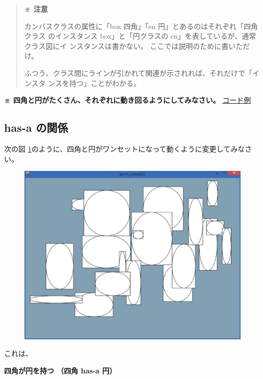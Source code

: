\documentclass[uplatex,a4j,11pt]{jsarticle}
\begin{document}
\begin{quotation}
 {\bfseries ※ 注意}

 カンバスクラスの属性に「box 四角」「en 円」とあるのはそれぞれ「四角クラス
 のインスタンス box」と「円クラスの en」を表しているが、通常クラス図にイ
 ンスタンスは書かない。
 ここでは説明のために書いただけ。

 ふつう、クラス間にラインが引かれて関連が示されれば、それだけで「インスタ
 ンスを持つ」ことがわかる。

\end{quotation}

{\bfseries ※ 四角と円がたくさん、それぞれに動き回るようにしてみなさい。}
\href{prim_class01.txt}{コード例}


\subsection{has-a の関係}

次の図 \ref{074547_20Jul14}のように、四角と円がワンセットになって動くように変更してみなさい。

\begin{figure}[htbp]
  \begin{center}
   \includegraphics[width=.5\paperwidth]{zu3.eps}
   \caption{}
   \label{074547_20Jul14}
  \end{center}
\end{figure}

これは、

\begin{center}
 {\bfseries 四角が円を持つ （四角 has-a 円）}
\end{center}
\end{document}
